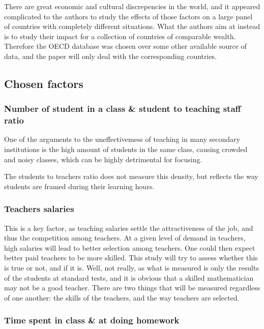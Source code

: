 \documentclass[12pt,a4paper]{article}
\begin{document}
There are great economic and cultural discrepencies in the world, and it appeared complicated to the authors to study the effects of those factors on a large panel of countries with completely different situations. What the authors aim at instead is to study their impact for a collection of countries of comparable wealth.
Therefore the OECD database was chosen over some other available source of data, and the paper will only deal with the corresponding countries.

\subsection{Chosen factors}

\subsubsection{Number of student in a class \& student to teaching staff ratio}

One of the arguments to the uneffectivemess of teaching in many secondary institutions is the high amount of students in the same class, causing crowded and noisy classes, which can be highly detrimental for focusing.

The students to teachers ratio does not measure this density, but reflects the way students are framed during their learning hours.

\subsubsection{Teachers salaries}

This is a key factor, as teaching salaries settle the attractiveness of the job, and thus the competition among teachers. At a given level of demand in teachers, high salaries will lead to better selection among teachers. One could then expect better paid teachers to be more skilled. This study will try to assess whether this is true or not, and if it is. Well, not really, as what is measured is only the results of the students at standard tests, and it is obvious that a skilled mathematician may not be a good teacher. There are two things that will be measured regardless of one another: the skills of the teachers, and the way teachers are selected.

\subsubsection{Time spent in class \& at doing homework}
\end{document}
